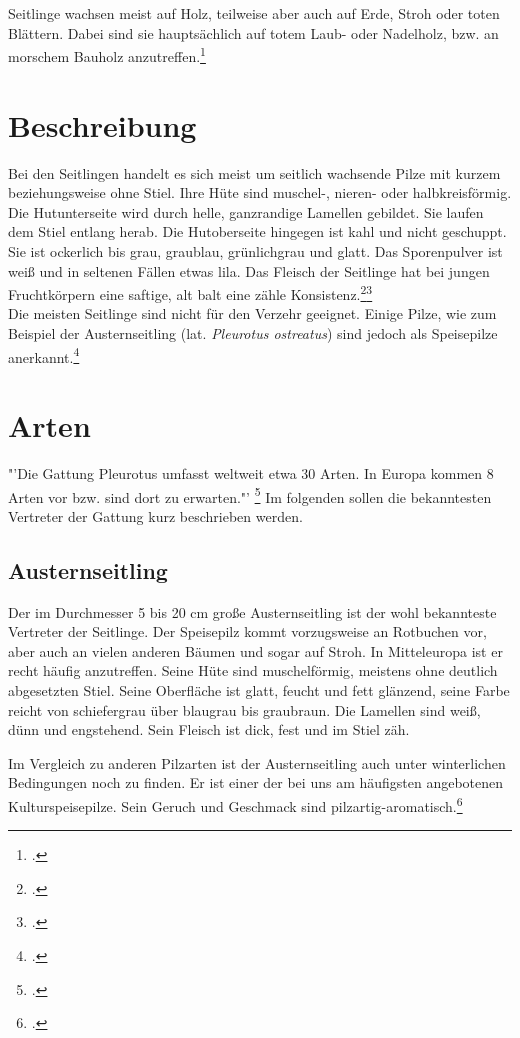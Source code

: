 \documentclass[a4paper,abstracton]{scrreprt}
\begin{document}
Seitlinge wachsen meist auf Holz, teilweise aber auch auf Erde, Stroh oder toten Blättern. Dabei sind sie hauptsächlich auf totem Laub- oder Nadelholz, bzw. an morschem Bauholz anzutreffen.\footcite{pilzech}

\section{Beschreibung}
Bei den Seitlingen handelt es sich meist um seitlich wachsende Pilze mit kurzem beziehungsweise ohne Stiel. Ihre Hüte sind muschel-, nieren- oder halbkreisförmig. Die Hutunterseite wird durch helle, ganzrandige Lamellen gebildet. Sie laufen dem Stiel entlang herab. Die Hutoberseite hingegen ist kahl und nicht geschuppt. Sie ist ockerlich bis grau, graublau, grünlichgrau und glatt. Das Sporenpulver ist weiß und in seltenen Fällen etwas lila. Das Fleisch der Seitlinge hat bei jungen Fruchtkörpern eine saftige, alt balt eine zähle Konsistenz.\footcite{faktenuber}\footcite{pilzech}\\
Die meisten Seitlinge sind nicht für den Verzehr geeignet. Einige Pilze, wie zum Beispiel der Austernseitling (lat. \emph{Pleurotus ostreatus}) sind jedoch als Speisepilze anerkannt.\footcite{pg_austernseitling}

\section{Arten}
"'Die Gattung Pleurotus umfasst weltweit etwa 30 Arten. In Europa kommen 8 Arten vor bzw. sind dort zu erwarten."' \footcite{faktenuber} Im folgenden sollen die bekanntesten Vertreter der Gattung kurz beschrieben werden.

\subsection{Austernseitling}
Der im Durchmesser 5 bis 20 cm große Austernseitling ist der wohl bekannteste Vertreter der Seitlinge. Der Speisepilz kommt vorzugsweise an Rotbuchen vor, aber auch an vielen anderen Bäumen und sogar auf Stroh. In Mitteleuropa ist er recht häufig anzutreffen. Seine Hüte sind muschelförmig, meistens ohne deutlich abgesetzten Stiel. Seine Oberfläche ist glatt, feucht und fett glänzend, seine Farbe reicht von schiefergrau über blaugrau bis graubraun. Die Lamellen sind weiß, dünn und engstehend. Sein Fleisch ist dick, fest und im Stiel zäh.

Im Vergleich zu anderen Pilzarten ist der Austernseitling auch unter winterlichen Bedingungen noch zu finden. Er ist einer der bei uns am häufigsten angebotenen Kulturspeisepilze. Sein Geruch und Geschmack sind pilzartig-aromatisch.\footcite{tintling_auster}
\end{document}
